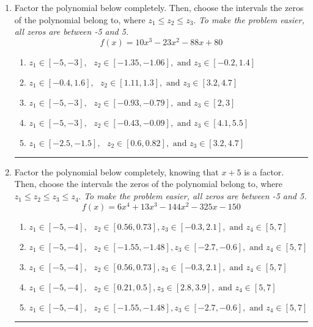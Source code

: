\documentclass[14pt]{extbook}
\newcommand{\litem}[1]{\item#1\hspace*{-1cm}\rule{\textwidth}{0.4pt}}
\begin{document}
\begin{enumerate}
\litem{
Factor the polynomial below completely. Then, choose the intervals the zeros of the polynomial belong to, where $z_1 \leq z_2 \leq z_3$. \textit{To make the problem easier, all zeros are between -5 and 5.}\[ f(x) = 10x^{3} -23 x^{2} -88 x + 80 \]\begin{enumerate}[label=\Alph*.]
\item \( z_1 \in [-5, -3], \text{   }  z_2 \in [-1.35, -1.06], \text{   and   } z_3 \in [-0.2, 1.4] \)
\item \( z_1 \in [-0.4, 1.6], \text{   }  z_2 \in [1.11, 1.3], \text{   and   } z_3 \in [3.2, 4.7] \)
\item \( z_1 \in [-5, -3], \text{   }  z_2 \in [-0.93, -0.79], \text{   and   } z_3 \in [2, 3] \)
\item \( z_1 \in [-5, -3], \text{   }  z_2 \in [-0.43, -0.09], \text{   and   } z_3 \in [4.1, 5.5] \)
\item \( z_1 \in [-2.5, -1.5], \text{   }  z_2 \in [0.6, 0.82], \text{   and   } z_3 \in [3.2, 4.7] \)

\end{enumerate} }
\litem{
Factor the polynomial below completely, knowing that $x+5$ is a factor. Then, choose the intervals the zeros of the polynomial belong to, where $z_1 \leq z_2 \leq z_3 \leq z_4$. \textit{To make the problem easier, all zeros are between -5 and 5.}\[ f(x) = 6x^{4} +13 x^{3} -144 x^{2} -325 x -150 \]\begin{enumerate}[label=\Alph*.]
\item \( z_1 \in [-5, -4], \text{   }  z_2 \in [0.56, 0.73], z_3 \in [-0.3, 2.1], \text{   and   } z_4 \in [5, 7] \)
\item \( z_1 \in [-5, -4], \text{   }  z_2 \in [-1.55, -1.48], z_3 \in [-2.7, -0.6], \text{   and   } z_4 \in [5, 7] \)
\item \( z_1 \in [-5, -4], \text{   }  z_2 \in [0.56, 0.73], z_3 \in [-0.3, 2.1], \text{   and   } z_4 \in [5, 7] \)
\item \( z_1 \in [-5, -4], \text{   }  z_2 \in [0.21, 0.5], z_3 \in [2.8, 3.9], \text{   and   } z_4 \in [5, 7] \)
\item \( z_1 \in [-5, -4], \text{   }  z_2 \in [-1.55, -1.48], z_3 \in [-2.7, -0.6], \text{   and   } z_4 \in [5, 7] \)


\end{enumerate}}
\end{enumerate}
\end{document}
